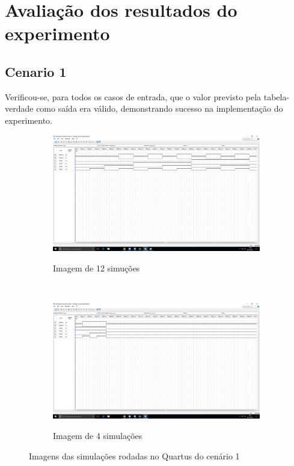 \chapter{Avaliação dos resultados do experimento}
\section{Cenario 1}
	Verificou-se, para todos os casos de entrada, que o valor previsto pela tabela-verdade
	como saída era válido, demonstrando sucesso na implementação do experimento.

	\begin{figure}[H]
	    \centering

	    \begin{subfigure}[b]{0.44\textwidth}
	        \includegraphics[width=\textwidth]{img/cenario1/printSimulacao1}
	        \label{fig:printSimulacao1}
			\caption{Imagem de 12 simuções}
	    \end{subfigure}
	    ~
	    \begin{subfigure}[b]{0.44\textwidth}
	        \includegraphics[width=\textwidth]{img/cenario1/printSimulacao2}
	        \label{fig:printSimulacao2}
			\caption{Imagem de 4 simulações}
	    \end{subfigure}

	    \caption{Imagens das simulações rodadas no Quartus do cenário 1}\label{fig:printSimulacoes}
	\end{figure}

